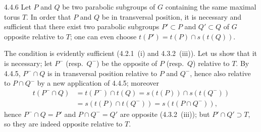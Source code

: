 \begin{corollary}{4.4.6}\label{XXVI.4.4.6}
Let $P$ and $Q$ be two parabolic subgroups of $G$ containing the same maximal torus $T$. In order that $P$ and $Q$ be in transversal position, it is necessary and sufficient that there exist two parabolic subgroups $P'\subset P$ and $Q'\subset Q$ of $G$ opposite relative to $T$; one can even choose $t(P')=t(P)\cap s(t(Q))$.
\end{corollary}
The condition is evidently sufficient (4.2.1~(i) and 4.3.2~(iii)). Let us show that it is necessary; let $P^-$ (resp.~$Q^-$) be the opposite of $P$ (resp.~$Q$) relative to $T$. By 4.4.5, $P^-\cap Q$ is in transversal position relative to $P$ and $Q^-$, hence also relative to $P\cap Q^-$ by a new application of 4.4.5; moreover
\[
\begin{aligned}
t(P^-\cap Q)&=t(P^-)\cap t(Q)=s(t(P))\cap s(t(Q^-))\\
&=s(t(P)\cap t(Q^-))=s(t(P\cap Q^-)),
\end{aligned}
\]
hence $P^-\cap Q=P'$ and $P\cap Q^-=Q'$ are opposite (4.3.2~(iii)); but $P'\cap Q'\supset T$, so they are indeed opposite relative to $T$.

